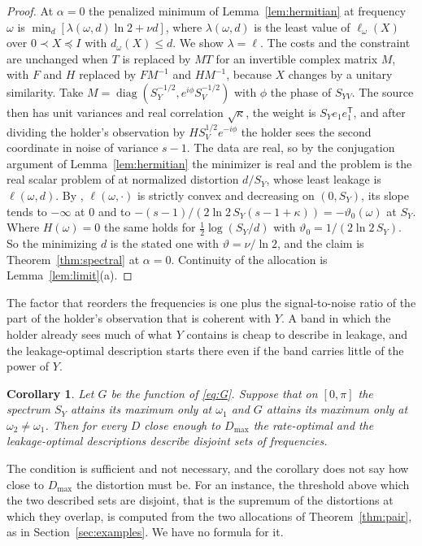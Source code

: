 \documentclass[11pt,onecolumn]{IEEEtran}
\newtheorem{corollary}[theorem]{Corollary}
\begin{document}
\begin{proof}
At $\alpha=0$ the penalized minimum of Lemma~\ref{lem:hermitian} at
frequency $\omega$ is
$\min_d[\lambda(\omega,d)\ln2+\nu d]$, where $\lambda(\omega,d)$ is the
least value of $\ell_\omega(X)$ over $0\prec X\preceq I$ with
$d_\omega(X)\le d$. We show $\lambda=\ell$. The costs and the constraint
are unchanged when $T$ is replaced by $MT$ for an invertible complex
matrix $M$, with $F$ and $H$ replaced by $FM^{-1}$ and $HM^{-1}$, because
$X$ changes by a unitary similarity. Take
$M=\operatorname{diag}(S_Y^{-1/2},e^{i\phi}S_V^{-1/2})$ with $\phi$ the
phase of $S_{YV}$. The source then has unit variances and real
correlation $\sqrt{\kappa}$, the weight is $S_Ye_1e_1^{\mathsf T}$, and
after dividing the holder's observation by $H S_V^{1/2}e^{-i\phi}$ the
holder sees the second coordinate in noise of variance $s-1$. The data
are real, so by the conjugation argument of Lemma~\ref{lem:hermitian}
the minimizer is real and the problem is the real scalar problem of \cite[Corollary~17]{part1} at
normalized distortion $d/S_Y$, whose least leakage is $\ell(\omega,d)$.
By \cite[Lemma~26]{part1}, $\ell(\omega,\cdot)$ is strictly convex and
decreasing on $(0,S_Y)$, its slope tends to $-\infty$ at $0$ and to
$-(s-1)/(2\ln2\,S_Y(s-1+\kappa))=-\vartheta_0(\omega)$ at $S_Y$. Where
$H(\omega)=0$ the same holds for $\tfrac12\log(S_Y/d)$ with
$\vartheta_0=1/(2\ln2\,S_Y)$. So the minimizing $d$ is the stated one
with $\vartheta=\nu/\ln2$, and the claim is Theorem~\ref{thm:spectral} at
$\alpha=0$. Continuity of the allocation is Lemma~\ref{lem:limit}(a).
\end{proof}

The factor that reorders the frequencies is one plus the signal-to-noise
ratio of the part of the holder's observation that is coherent with
$Y$. A band in which the holder already sees much of what $Y$ contains
is cheap to describe in leakage, and the leakage-optimal description
starts there even if the band carries little of the power of $Y$.

\begin{corollary}\label{cor:bands}
Let $G$ be the function of \eqref{eq:G}. Suppose that
on $[0,\pi]$ the spectrum $S_Y$ attains its maximum only at $\omega_1$
and $G$ attains its maximum only at $\omega_2\ne\omega_1$. Then for every
$D$ close enough to $D_{\max}$ the rate-optimal and the leakage-optimal
descriptions describe disjoint sets of frequencies.
\end{corollary}

The condition is sufficient and not necessary, and the corollary does
not say how close to $D_{\max}$ the distortion must be. For an instance,
the threshold above which the two described sets are disjoint, that is
the supremum of the distortions at which they overlap, is computed
from the two allocations of Theorem~\ref{thm:pair}, as in
Section~\ref{sec:examples}. We have no formula for it.
\end{document}
